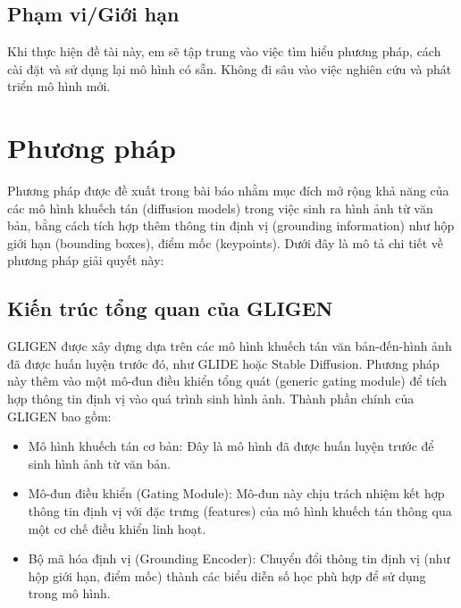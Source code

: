 \documentclass[12pt]{report}
\begin{document}
\section{Phạm vi/Giới hạn}
Khi thực hiện đề tài này, em sẽ tập trung vào việc tìm hiểu phương pháp,
cách cài đặt và sử dụng lại mô hình có sẵn.
Không đi sâu vào việc nghiên cứu và phát triển mô hình mới.

\chapter{Phương pháp}

Phương pháp được đề xuất trong bài báo nhằm mục đích mở rộng khả năng của các mô hình khuếch tán
(diffusion models) trong việc sinh ra hình ảnh từ văn bản,
bằng cách tích hợp thêm thông tin định vị (grounding information)
như hộp giới hạn (bounding boxes), điểm mốc (keypoints).
Dưới đây là mô tả chi tiết về phương pháp giải quyết này:

\section{Kiến trúc tổng quan của GLIGEN}
GLIGEN được xây dựng dựa trên các mô hình khuếch tán văn bản-đến-hình ảnh đã được huấn luyện trước đó,
như GLIDE hoặc Stable Diffusion.
Phương pháp này thêm vào một mô-đun điều khiển tổng quát (generic gating module)
để tích hợp thông tin định vị vào quá trình sinh hình ảnh. Thành phần chính của GLIGEN bao gồm:
\begin{itemize}
	\item Mô hình khuếch tán cơ bản: Đây là mô hình đã được huấn luyện trước để sinh hình ảnh từ văn bản.
	\item Mô-đun điều khiển (Gating Module):
	      Mô-đun này chịu trách nhiệm kết hợp thông tin định vị với đặc trưng (features)
	      của mô hình khuếch tán thông qua một cơ chế điều khiển linh hoạt.
	\item Bộ mã hóa định vị (Grounding Encoder): Chuyển đổi thông tin định vị
	      (như hộp giới hạn, điểm mốc) thành các biểu diễn số học phù hợp để sử dụng trong mô hình.
\end{itemize}
\end{document}
